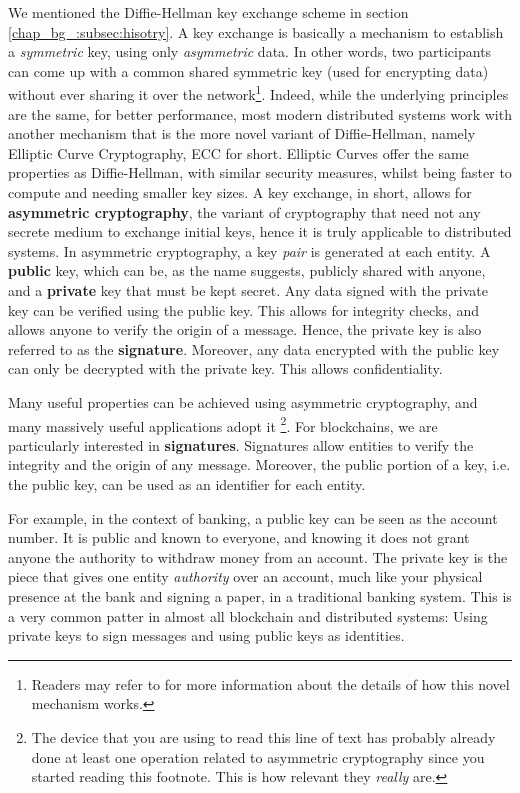 We mentioned the Diffie-Hellman key exchange scheme in section \ref{chap_bg_:subsec:hisotry}. A key
exchange is basically a mechanism to establish a \textit{symmetric} key, using only
\textit{asymmetric} data. In other words, two participants can come up with a common shared
symmetric key (used for encrypting data) without ever sharing it over the network\footnote{Readers
may refer to \cite{diffieNewDirectionsCryptography1976} for more information about the details of
how this novel mechanism works.}. Indeed, while the underlying principles are the same, for better
performance, most modern distributed systems work with another mechanism that is the more novel
variant of Diffie-Hellman, namely Elliptic Curve Cryptography, ECC for short. Elliptic Curves offer
the same properties as Diffie-Hellman, with similar security measures, whilst being faster to
compute and needing smaller key sizes. A key exchange, in short, allows for \textbf{asymmetric
cryptography}, the variant of cryptography that need not any secrete medium to exchange initial
keys, hence it is truly applicable to distributed systems. In asymmetric cryptography, a key
\textit{pair} is generated at each entity. A \textbf{public} key, which can be, as the name
suggests, publicly shared with anyone, and a \textbf{private} key that must be kept secret. Any data
signed with the private key can be verified using the public key. This allows for integrity checks,
and allows anyone to verify the origin of a message. Hence, the private key is also referred to as
the \textbf{signature}. Moreover, any data encrypted with the public key can only be decrypted with
the private key. This allows confidentiality.

Many useful properties can be achieved using asymmetric cryptography, and many massively useful
applications adopt it \footnote{The device that you are using to read this line of text has probably
already done at least one operation related to asymmetric cryptography since you started reading
this footnote. This is how relevant they \textit{really} are.}. For blockchains, we are particularly
interested in \textbf{signatures}. Signatures allow entities to verify the integrity and the origin
of any message. Moreover, the public portion of a key, i.e. the public key, can be used as an
identifier for each entity.

For example, in the context of banking, a public key can be seen as the account number. It is public
and known to everyone, and knowing it does not grant anyone the authority to withdraw money from an
account. The private key is the piece that gives one entity \textit{authority} over an account, much
like your physical presence at the bank and signing a paper, in a traditional banking system. This
is a very common patter in almost all blockchain and distributed systems: Using private keys to sign
messages and using public keys as identities.

